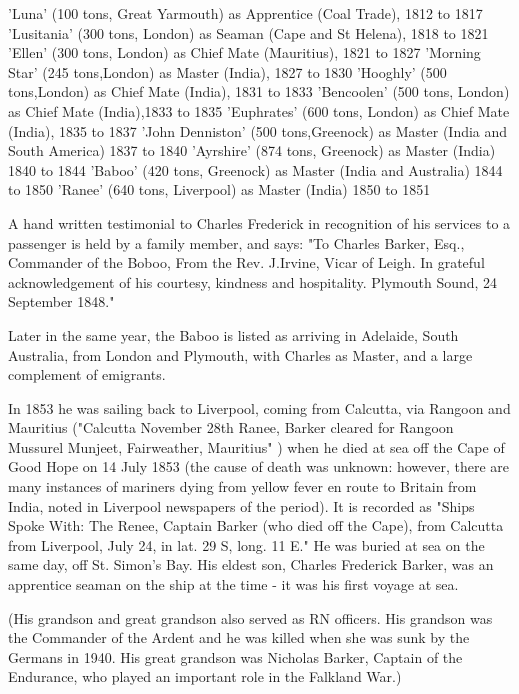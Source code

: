 'Luna' (100 tons, Great Yarmouth) as Apprentice (Coal Trade), 1812 to 1817
'Lusitania' (300 tons, London) as Seaman (Cape and St Helena), 1818 to 1821
'Ellen' (300 tons, London) as Chief Mate (Mauritius), 1821 to 1827
'Morning Star' (245 tons,London) as Master (India), 1827 to 1830
'Hooghly' (500 tons,London) as Chief Mate (India), 1831 to 1833
'Bencoolen' (500 tons, London) as Chief Mate (India),1833 to 1835
'Euphrates' (600 tons, London) as Chief Mate (India), 1835 to 1837
'John Denniston' (500 tons,Greenock) as Master (India and South America) 1837 to 1840
'Ayrshire' (874 tons, Greenock) as Master (India) 1840 to 1844
'Baboo' (420 tons, Greenock) as Master (India and Australia) 1844 to 1850
'Ranee' (640 tons, Liverpool) as Master (India) 1850 to 1851
\cite{CFBShipList}


A hand written testimonial to Charles Frederick in recognition of his services to a passenger is held by a family member, and says:
"To Charles Barker, Esq., Commander of the Boboo,
From the Rev. J.Irvine, Vicar of Leigh.
In grateful acknowledgement of his courtesy, kindness and hospitality.
Plymouth Sound, 24 September 1848."

Later in the same year, the Baboo is listed as arriving in Adelaide, South Australia, from London and Plymouth, with Charles as Master, and a large complement of emigrants.\cite{CFBBaboo}

In 1853 he was sailing back to Liverpool, coming from Calcutta, via Rangoon and Mauritius ("Calcutta November 28th Ranee, Barker cleared for Rangoon Mussurel Munjeet, Fairweather, Mauritius" \cite{CFBRanee}) when he died at sea off the Cape of Good Hope on 14 July 1853 (the cause of death was unknown: however, there are many instances of mariners dying from yellow fever en route to Britain from India, noted in Liverpool newspapers of the period). It is recorded as  "Ships Spoke With: The Renee, Captain Barker (who died off the Cape), from Calcutta from Liverpool, July 24, in lat. 29 S, long. 11 E."\cite{CFBDeath}
He was buried at sea on the same day, off St. Simon's Bay. His eldest son, Charles Frederick Barker, was an apprentice seaman on the ship at the time - it was his first voyage at sea.

(His grandson and great grandson also served as RN officers. His grandson was the Commander of the Ardent and he was killed when she was sunk by the Germans in 1940. His great grandson was Nicholas Barker, Captain of the Endurance, who played an important role in the Falkland War.)

